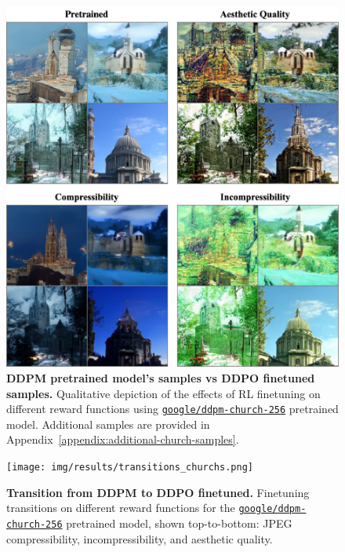 \begin{figure}[ht]
  \centering
  \includegraphics[scale=0.85]{img/results/visual-comparison-church-results.png}
  \vspace{-0pt}  %
    \captionsetup{width=\textwidth} %
    \caption{\textbf{DDPM pretrained model's samples vs DDPO finetuned samples.} Qualitative depiction of the effects of RL finetuning on different reward functions using \href{https://huggingface.co/google/ddpm-church-256}{\texttt{\texttt{google/ddpm-church-256}}}
    pretrained model. Additional samples are provided in Appendix~\ref{appendix:additional-church-samples}.}
    \label{fig:visual-comparison-ddpo-church}
\end{figure}


\begin{figure}[ht]
  \centering
  \texttt{[image: img/results/transitions\_churchs.png]}
  \vspace{-15pt}  %
    \captionsetup{width=\textwidth} %
    \caption{\textbf{Transition from DDPM to DDPO finetuned.} Finetuning transitions on different reward functions for the \href{https://huggingface.co/google/ddpm-church-256}{\texttt{\texttt{google/ddpm-church-256}}} pretrained model, shown top-to-bottom: JPEG compressibility, incompressibility, and aesthetic quality.}
    \label{fig:ddpm-to-ddpo-church}
\end{figure}

